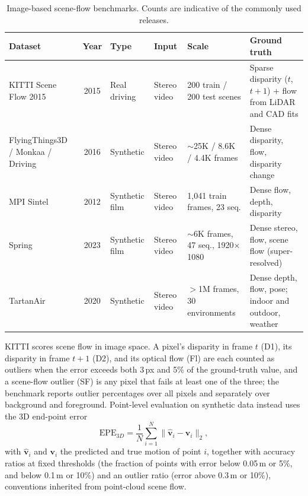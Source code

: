 \begin{table}[t]
\centering
\fontsize{9}{11}\selectfont
\setlength{\tabcolsep}{1.0mm}
\caption{Image-based scene-flow benchmarks. Counts are indicative of the commonly used releases.}
\label{tab:scene_flow_datasets}
\begin{tabular}{L{0.26\textwidth} c C{0.10\textwidth} C{0.11\textwidth} C{0.14\textwidth} L{0.24\textwidth}}
\toprule
\textbf{Dataset} & \textbf{Year} & \textbf{Type} & \textbf{Input} & \textbf{Scale} & \textbf{Ground truth} \\
\midrule
KITTI Scene Flow 2015~\cite{menze2015object} & 2015 & Real driving & Stereo video & 200 train / 200 test scenes & Sparse disparity ($t$, $t{+}1$) + flow from LiDAR and CAD fits \\
FlyingThings3D / Monkaa / Driving~\cite{mayer2016large} & 2016 & Synthetic & Stereo video & $\sim$25K / 8.6K / 4.4K frames & Dense disparity, flow, disparity change \\
MPI Sintel~\cite{sintel} & 2012 & Synthetic film & Stereo video & 1,041 train frames, 23 seq. & Dense flow, depth, disparity \\
Spring~\cite{Spring} & 2023 & Synthetic film & Stereo video & $\sim$6K frames, 47 seq., 1920$\times$1080 & Dense stereo, flow, scene flow (super-resolved) \\
TartanAir~\cite{TartanAir} & 2020 & Synthetic & Stereo video & $>$1M frames, 30 environments & Dense depth, flow, pose; indoor and outdoor, weather \\
\bottomrule
\end{tabular}
\end{table}

KITTI scores scene flow in image space. A pixel's disparity in frame $t$ (D1), its disparity in frame $t{+}1$ (D2), and its optical flow (Fl) are each counted as outliers when the error exceeds both 3\,px and 5\% of the ground-truth value, and a scene-flow outlier (SF) is any pixel that fails at least one of the three; the benchmark reports outlier percentages over all pixels and separately over background and foreground. Point-level evaluation on synthetic data instead uses the 3D end-point error
\begin{equation}
    \mathrm{EPE}_{3D} = \frac{1}{N} \sum_{i=1}^{N} \| \hat{\mathbf{v}}_i - \mathbf{v}_i \|_2,
\end{equation}
with $\hat{\mathbf{v}}_i$ and $\mathbf{v}_i$ the predicted and true motion of point $i$, together with accuracy ratios at fixed thresholds (the fraction of points with error below 0.05\,m or 5\%, and below 0.1\,m or 10\%) and an outlier ratio (error above 0.3\,m or 10\%), conventions inherited from point-cloud scene flow.

